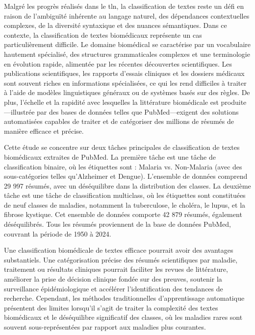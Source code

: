 \documentclass[12pt]{report}
\begin{document}
Malgré les progrès réalisés dans le \gls{tln}, la classification de textes reste un défi en raison de l’ambiguïté inhérente au langage naturel, des dépendances contextuelles complexes, de la diversité syntaxique et des nuances sémantiques. Dans ce contexte, la classification de textes biomédicaux représente un cas particulièrement difficile. Le domaine biomédical se caractérise par un vocabulaire hautement spécialisé, des structures grammaticales complexes et une terminologie en évolution rapide, alimentée par les récentes découvertes scientifiques. Les publications scientifiques, les rapports d’essais cliniques et les dossiers médicaux sont souvent riches en informations spécialisées, ce qui les rend difficiles à traiter à l’aide de modèles linguistiques généraux ou de systèmes basés sur des règles. De plus, l’échelle et la rapidité avec lesquelles la littérature biomédicale est produite—illustrée par des bases de données telles que PubMed—exigent des solutions automatisées capables de traiter et de catégoriser des millions de résumés de manière efficace et précise. 

Cette étude se concentre sur deux tâches principales de classification de textes biomédicaux extraites de PubMed. La première tâche est une tâche de classification binaire, où les étiquettes sont : Malaria vs. Non-Malaria (avec des sous-catégories telles qu’Alzheimer et Dengue). L’ensemble de données comprend 29 997 résumés, avec un déséquilibre dans la distribution des classes. La deuxième tâche est une tâche de classification multiclass, où les étiquettes sont constituées de neuf classes de maladies, notamment la tuberculose, le choléra, le lupus, et la fibrose kystique. Cet ensemble de données comporte 42 879 résumés, également déséquilibrés. Tous les résumés proviennent de la base de données PubMed, couvrant la période de 1950 à 2024. 

Une classification biomédicale de textes efficace pourrait avoir des avantages substantiels. Une catégorisation précise des résumés scientifiques par maladie, traitement ou résultats cliniques pourrait faciliter les revues de littérature, améliorer la prise de décision clinique fondée sur des preuves, soutenir la surveillance épidémiologique et accélérer l’identification des tendances de recherche. Cependant, les méthodes traditionnelles d’apprentissage automatique présentent des limites lorsqu’il s’agit de traiter la complexité des textes biomédicaux et le déséquilibre significatif des classes, où les maladies rares sont souvent sous-représentées par rapport aux maladies plus courantes. 
\end{document}

